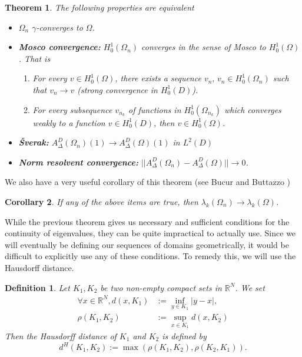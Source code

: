 \documentclass[12pt]{report}
\newtheorem{theorem}{Theorem}[section]
\newtheorem{corollary}[theorem]{Corollary}
\newtheorem{definition}{Definition}
\numberwithin{definition}{section}
\begin{document}
\begin{theorem}
  The following properties are equivalent
  \begin{itemize}
    \item $\Omega_{n}$ $\gamma$-converges to $\Omega$.
    \item \textbf{Mosco convergence:} $H_{0}^{1}(\Omega_{n})$ converges in the sense of Mosco to $H_{0}^{1}(\Omega)$.
      That is
      \begin{enumerate}
        \item[(M1)] For every $v \in H_{0}^{1}(\Omega)$, there exists a sequence $v_{n}, \, v_{n} \in H_{0}^{1}(\Omega_{n})$ such that $v_{n} \to v$ (strong convergence in $H_{0}^{1}(D)$).
        \item[(M2)] For every subsequence $v_{n_{k}}$ of functions in $H_{0}^{1}(\Omega_{n_{k}})$ which converges weakly to a function $v \in H_{0}^{1}(D)$, then $v \in H_{0}^{1}(\Omega)$.
      \end{enumerate}
    \item \textbf{Šverak:} $A_{\Delta}^{D}(\Omega_{n})(1) \to A_{\Delta}^{D}(\Omega)(1)$ in $L^{2}(D)$
    \item \textbf{Norm resolvent convergence:} $|| A_{\Delta}^{D}(\Omega_{n}) - A_{\Delta}^{D}(\Omega) || \to 0$.
  \end{itemize}
\end{theorem}

We also have a very useful corollary of this theorem (see Bucur and Buttazzo \cite{convergence})

\begin{corollary}
  If any of the above items are true, then $\lambda_{k}(\Omega_{n}) \to \lambda_{k}(\Omega)$.
\end{corollary}

While the previous theorem gives us necessary and sufficient conditions for the continuity of eigenvalues, they can be quite impractical to actually use.
Since we will eventually be defining our sequences of domains geometrically, it would be difficult to explicitly use any of these conditions.
To remedy this, we will use the Hausdorff distance.

\begin{definition}
  Let $K_{1},K_{2}$ be two non-empty compact sets in $\mathbb{R}^{N}$.
  We set 
  \begin{align*}
    \forall x \in \mathbb{R}^{N}, d(x,K_{1}) &:= \inf_{y\in K_{1}} | y - x |, \\
    \rho(K_{1},K_{2}) &:= \sup_{x\in K_{1}} d(x,K_{2})
  \end{align*}
  Then the Hausdorff distance of $K_{1}$ and $K_{2}$ is defined by 
  \[
  d^{H}(K_{1},K_{2}) := \max (\rho(K_{1},K_{2}),\rho(K_{2},K_{1}))
  .\] 
\end{definition}
\end{document}

